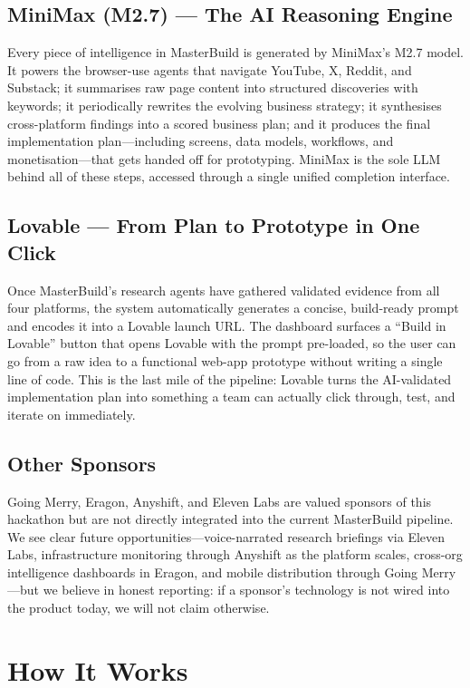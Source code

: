 \documentclass[11pt, letterpaper]{article}
\begin{document}
\subsection{MiniMax (M2.7) --- The AI Reasoning Engine}
Every piece of intelligence in MasterBuild is generated by MiniMax's M2.7 model.
It powers the browser-use agents that navigate YouTube, X, Reddit, and Substack;
it summarises raw page content into structured discoveries with keywords; it
periodically rewrites the evolving business strategy; it synthesises
cross-platform findings into a scored business plan; and it produces the final
implementation plan---including screens, data models, workflows, and
monetisation---that gets handed off for prototyping. MiniMax is the sole LLM
behind all of these steps, accessed through a single unified completion
interface.

\subsection{Lovable --- From Plan to Prototype in One Click}
Once MasterBuild's research agents have gathered validated evidence from all
four platforms, the system automatically generates a concise, build-ready prompt
and encodes it into a Lovable launch URL. The dashboard surfaces a
``Build in Lovable'' button that opens Lovable with the prompt pre-loaded, so
the user can go from a raw idea to a functional web-app prototype without
writing a single line of code. This is the last mile of the pipeline: Lovable
turns the AI-validated implementation plan into something a team can actually
click through, test, and iterate on immediately.

\subsection{Other Sponsors}
Going Merry, Eragon, Anyshift, and Eleven Labs are valued sponsors of this
hackathon but are not directly integrated into the current MasterBuild
pipeline. We see clear future opportunities---voice-narrated research briefings
via Eleven Labs, infrastructure monitoring through Anyshift as the platform
scales, cross-org intelligence dashboards in Eragon, and mobile distribution
through Going Merry---but we believe in honest reporting: if a sponsor's
technology is not wired into the product today, we will not claim otherwise.

\section{How It Works}
\end{document}
